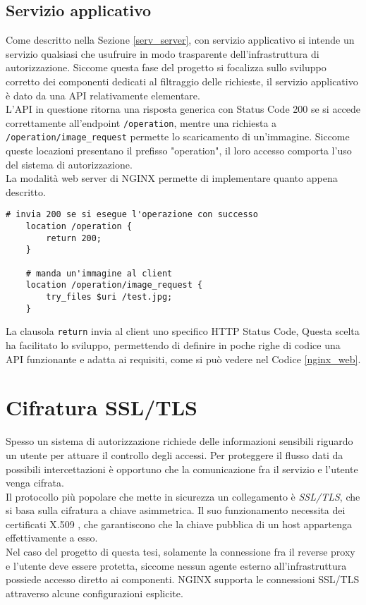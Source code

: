 \subsection{Servizio applicativo}
Come descritto nella Sezione \ref*{serv_server}, con servizio applicativo si intende un servizio qualsiasi che usufruire in modo trasparente 
dell'infrastruttura di autorizzazione. 
Siccome questa fase del progetto si focalizza sullo sviluppo corretto dei componenti dedicati 
al filtraggio delle richieste, il servizio applicativo è dato da una API relativamente elementare. \\
L'API in questione ritorna una risposta generica con Status Code 200 se si accede correttamente all'endpoint \texttt{/operation}, 
mentre una richiesta a \texttt{/operation/image\_request} permette lo scaricamento di 
un'immagine. Siccome queste locazioni presentano il prefisso "operation", il loro accesso comporta l'uso 
del sistema di autorizzazione.  
\\La modalità web server di NGINX permette di implementare quanto appena descritto.
\lstset{language=nginx}
\begin{lstlisting}[caption={[Frammento di codice del servizio applicativo]Frammento di codice del servizio applicativo che mostra le funzionalità associate agli endpoint.},captionpos=b,label=nginx_web]
    # invia 200 se si esegue l'operazione con successo
    location /operation {
        return 200;
    }

    # manda un'immagine al client
    location /operation/image_request {
        try_files $uri /test.jpg;
    }
\end{lstlisting}
La clausola \texttt{return} invia al client uno specifico HTTP Status Code,  
Questa scelta ha facilitato lo sviluppo, permettendo di definire in poche righe di codice una API funzionante e adatta ai requisiti,  
come si può vedere nel Codice \ref*{nginx_web}.

\section{Cifratura SSL/TLS}
Spesso un sistema di autorizzazione richiede delle informazioni sensibili riguardo un utente per attuare il controllo 
degli accessi. 
Per proteggere il flusso dati da possibili intercettazioni è opportuno che la comunicazione fra il servizio e l'utente venga cifrata. 
\\ Il protocollo più popolare che mette in sicurezza un collegamento \newline è \textit{SSL/TLS}, che si basa sulla cifratura a chiave asimmetrica. Il suo funzionamento necessita 
dei certificati X.509 \cite{x509_rfc}, che garantiscono che la chiave pubblica di un host appartenga effettivamente a esso. 
\\ Nel caso del progetto di questa tesi, solamente la connessione fra il reverse proxy e l'utente deve essere protetta, siccome nessun agente esterno
 all'infrastruttura possiede accesso diretto ai componenti.
NGINX supporta le connessioni SSL/TLS attraverso alcune configurazioni esplicite.

